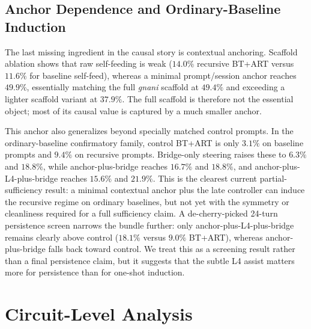 \documentclass{article}
\begin{document}
\subsection{Anchor Dependence and Ordinary-Baseline Induction}
\label{sec:anchor_dependence}

The last missing ingredient in the causal story is contextual anchoring.
Scaffold ablation shows that raw self-feeding is weak
($14.0\%$ recursive BT+ART versus $11.6\%$ for baseline self-feed), whereas a minimal
prompt/session anchor reaches $49.9\%$, essentially matching the full \emph{gnani} scaffold at
$49.4\%$ and exceeding a lighter scaffold variant at $37.9\%$.
The full scaffold is therefore not the essential object; most of its causal value is captured by a
much smaller anchor.

This anchor also generalizes beyond specially matched control prompts.
In the ordinary-baseline confirmatory family, control BT+ART is only $3.1\%$ on baseline prompts
and $9.4\%$ on recursive prompts.
Bridge-only steering raises these to $6.3\%$ and $18.8\%$, while
anchor-plus-bridge reaches $16.7\%$ and $18.8\%$, and
anchor-plus-L4-plus-bridge reaches $15.6\%$ and $21.9\%$.
This is the clearest current partial-sufficiency result:
a minimal contextual anchor plus the late controller can induce the recursive regime on ordinary
baselines, but not yet with the symmetry or cleanliness required for a full sufficiency claim.
A de-cherry-picked 24-turn persistence screen narrows the bundle further:
only anchor-plus-L4-plus-bridge remains clearly above control
($18.1\%$ versus $9.0\%$ BT+ART), whereas
anchor-plus-bridge falls back toward control.
We treat this as a screening result rather than a final persistence claim, but it suggests that
the subtle L4 assist matters more for persistence than for one-shot induction.


\section{Circuit-Level Analysis}
\label{sec:circuits}
\end{document}
